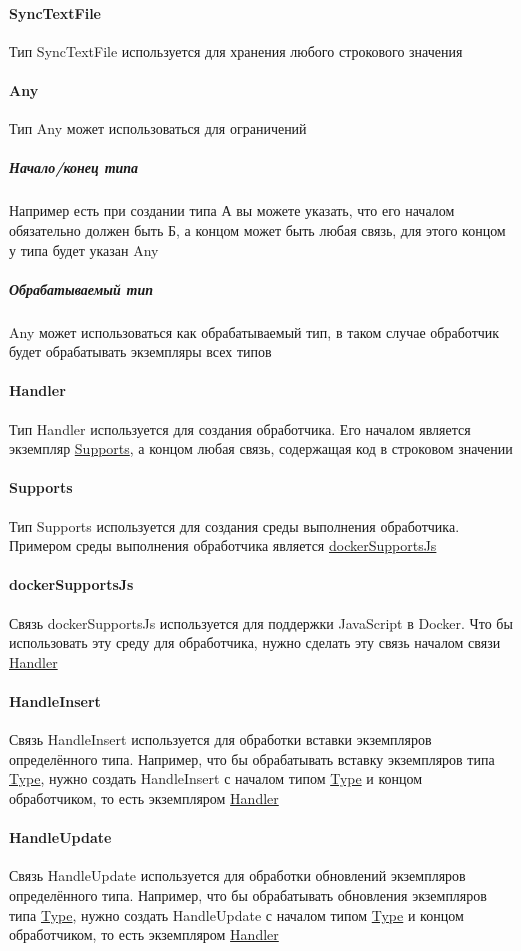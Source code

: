\documentclass{article}
\begin{document}
\paragraph*{SyncTextFile}
Тип SyncTextFile\hypertarget{SyncTextFile.Def}{} используется для хранения
любого строкового значения
\paragraph*{Any}
Тип Any\hypertarget{any.Def}{} может использоваться для ограничений
\subparagraph*{Начало/конец типа}
Например есть при создании типа А вы можете указать, что его началом
обязательно должен быть Б, а концом может быть любая связь, для этого концом у
типа будет указан Any
\subparagraph*{Обрабатываемый тип}
Any может использоваться как обрабатываемый тип, в таком случае обработчик
будет обрабатывать экземпляры всех типов
\paragraph*{Handler}
Тип Handler\hypertarget{handler.Def}{} используется для создания обработчика.
Его началом является экземпляр \hyperlink{supports.Def}{Supports}, а концом
любая связь, содержащая код в строковом значении
\paragraph*{Supports}
Тип Supports\hypertarget{handler.Def}{} используется для создания среды
выполнения обработчика. Примером среды выполнения обработчика является
\hyperlink{dockerSupportsJs.Def}{dockerSupportsJs}
\paragraph*{dockerSupportsJs}
Связь dockerSupportsJs\hypertarget{dockerSupportsJs.Def}{} используется для
поддержки JavaScript в Docker. Что бы использовать эту среду для обработчика,
нужно сделать эту связь началом связи \hyperlink{handler.Def}{Handler}
\paragraph*{HandleInsert}
Связь HandleInsert\hypertarget{HandleInsert.Def}{} используется для обработки
вставки экземпляров определённого типа. Например, что бы обрабатывать вставку
экземпляров типа \hyperlink{type.Def}{Type}, нужно создать HandleInsert с
началом типом \hyperlink{type.Def}{Type} и концом обработчиком, то есть
экземпляром \hyperlink{handler.Def}{Handler}
\paragraph*{HandleUpdate}
Связь HandleUpdate\hypertarget{HandleUpdate.Def}{} используется для обработки
обновлений экземпляров определённого типа. Например, что бы обрабатывать
обновления экземпляров типа \hyperlink{type.Def}{Type}, нужно создать
HandleUpdate с началом типом \hyperlink{type.Def}{Type} и концом обработчиком,
то есть экземпляром \hyperlink{handler.Def}{Handler}
\end{document}
